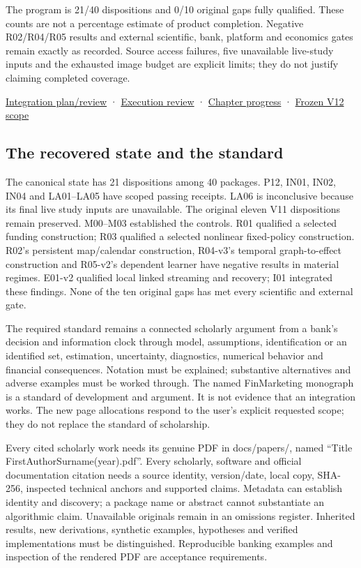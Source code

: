 \documentclass[
  11pt,
  a4paper,
]{article}
\begin{document}
The program is 21/40 dispositions and 0/10 original gaps fully
qualified. These counts are not a percentage estimate of product
completion. Negative R02/R04/R05 results and external scientific, bank,
platform and economics gates remain exactly as recorded. Source access
failures, five unavailable live-study inputs and the exhausted image
budget are explicit limits; they do not justify claiming completed
coverage.

\href{repair-v12/integration-plan-2026-10-12.md}{Integration
plan/review} · \href{repair-v12/integrated-reader/review.md}{Execution
review} ·
\href{repair-v12/integrated-reader/chapter-progress.json}{Chapter
progress} · \href{master-program-v12.md}{Frozen V12 scope}

\hypertarget{the-recovered-state-and-the-standard}{%
\subsection{The recovered state and the
standard}\label{the-recovered-state-and-the-standard}}

The canonical state has 21 dispositions among 40 packages. P12, IN01,
IN02, IN04 and LA01--LA05 have scoped passing receipts. LA06 is
inconclusive because its final live study inputs are unavailable. The
original eleven V11 dispositions remain preserved. M00--M03 established
the controls. R01 qualified a selected funding construction; R03
qualified a selected nonlinear fixed-policy construction. R02's
persistent map/calendar construction, R04-v3's temporal graph-to-effect
construction and R05-v2's dependent learner have negative results in
material regimes. E01-v2 qualified local linked streaming and recovery;
I01 integrated these findings. None of the ten original gaps has met
every scientific and external gate.

The required standard remains a connected scholarly argument from a
bank's decision and information clock through model, assumptions,
identification or an identified set, estimation, uncertainty,
diagnostics, numerical behavior and financial consequences. Notation
must be explained; substantive alternatives and adverse examples must be
worked through. The named FinMarketing monograph is a standard of
development and argument. It is not evidence that an integration works.
The new page allocations respond to the user's explicit requested scope;
they do not replace the standard of scholarship.

Every cited scholarly work needs its genuine PDF in docs/papers/, named
``Title FirstAuthorSurname(year).pdf''. Every scholarly, software and
official documentation citation needs a source identity, version/date,
local copy, SHA-256, inspected technical anchors and supported claims.
Metadata can establish identity and discovery; a package name or
abstract cannot substantiate an algorithmic claim. Unavailable originals
remain in an omissions register. Inherited results, new derivations,
synthetic examples, hypotheses and verified implementations must be
distinguished. Reproducible banking examples and inspection of the
rendered PDF are acceptance requirements.
\end{document}
